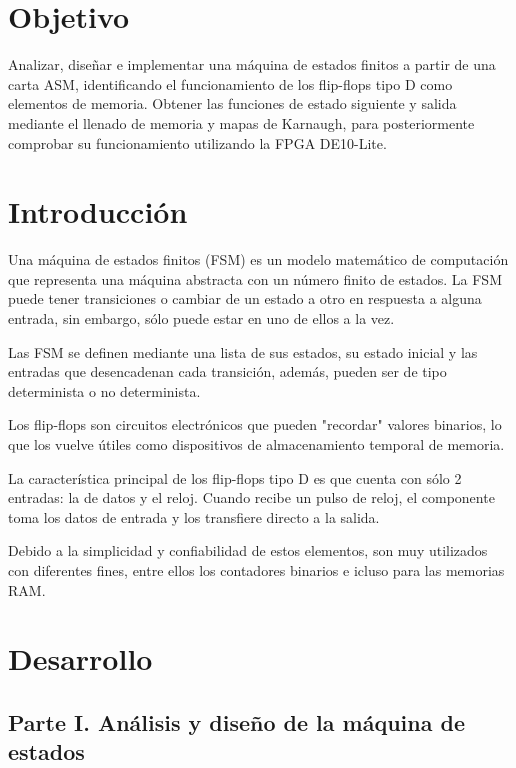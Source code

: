 \documentclass[12pt, letterpaper]{article}
\begin{document}


\section*{Objetivo}

Analizar, diseñar e implementar una máquina de estados finitos a partir de una carta ASM, identificando el funcionamiento de los flip-flops tipo D como elementos de memoria. Obtener las funciones de estado siguiente y salida mediante el llenado de memoria y mapas de Karnaugh, para posteriormente comprobar su funcionamiento utilizando la FPGA DE10-Lite.

\section*{Introducción}

Una máquina de estados finitos (FSM) es un modelo matemático de computación que representa una máquina abstracta con un número finito de estados. La FSM puede tener transiciones o cambiar de un estado a otro en respuesta a alguna entrada, sin embargo, sólo puede estar en uno de ellos a la vez.

Las FSM se definen mediante una lista de sus estados, su estado inicial y las entradas que desencadenan cada transición, además, pueden ser de tipo determinista o no determinista. 

Los flip-flops son circuitos electrónicos que pueden "recordar" valores binarios, lo que los vuelve útiles como dispositivos de almacenamiento temporal de memoria.

La característica principal de los flip-flops tipo D es que cuenta con sólo 2 entradas: la de datos y el reloj. Cuando recibe un pulso de reloj, el componente toma los datos de entrada y los transfiere directo a la salida.

Debido a la simplicidad y confiabilidad de estos elementos, son muy utilizados con diferentes fines, entre ellos los contadores binarios e icluso para las memorias RAM.

\section*{Desarrollo}

\subsection*{Parte I. Análisis y diseño de la máquina de estados}
\end{document}
